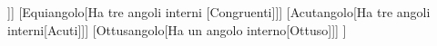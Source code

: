 \documentclass[10pt,a4paper]{standalone}
\begin{document}
	\begin{forest}
		[Triangolo
		[Rettangolo[Ha una angolo interno[Retto]]]
		[Equiangolo[Ha tre angoli interni [Congruenti]]]
		[Acutangolo[Ha tre angoli interni[Acuti]]]
		[Ottusangolo[Ha un angolo interno[Ottuso]]]
		]
	\end{forest}
\end{document}
